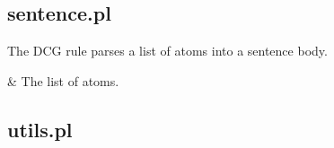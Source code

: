 \subsection{sentence.pl}

\label{sec:sentence}

\begin{description}
The  DCG rule parses a list of atoms into a sentence body.

\begin{arguments}
 & The list of atoms. \\
\end{arguments}
\end{description}

\subsection{utils.pl}

\label{sec:utils}

